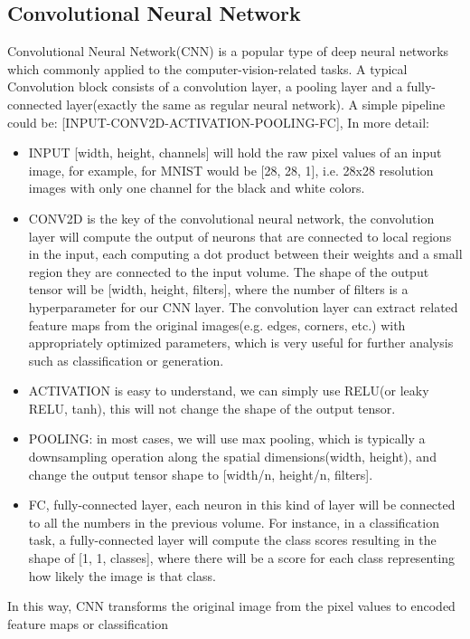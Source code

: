 \subsection{Convolutional Neural Network}
\nocite{cs231n}
Convolutional Neural Network(CNN) is a popular type of deep neural networks which commonly applied to 
the computer-vision-related tasks. 
A typical Convolution block consists of a convolution layer, a pooling layer and a 
fully-connected layer(exactly the same as regular neural network). A simple pipeline could be:
[INPUT-CONV2D-ACTIVATION-POOLING-FC], In more detail:
\begin{itemize}
    \item INPUT [width, height, channels] will hold the raw pixel values of an input image, for example, for MNIST
    would be [28, 28, 1], i.e. 28x28 resolution images with only one channel for the black and white colors.
    \item CONV2D is the key of the convolutional neural network, the convolution layer 
    will compute the output of neurons that are connected to local regions in the input, each 
    computing a dot product between their weights and a small region they are connected to the input volume.
    The shape of the output tensor will be [width, height, filters], where the number of filters is a hyperparameter for our 
    CNN layer. The convolution layer can extract related feature maps from the original images(e.g. edges, corners, etc.)
    with appropriately optimized parameters, which is very useful for further analysis 
    such as classification or generation. 
    \item ACTIVATION is easy to understand, we can simply use RELU(or leaky RELU, tanh), this will not change 
    the shape of the output tensor.
    \item POOLING: in most cases, we will use max pooling, which is typically a downsampling operation along the 
    spatial dimensions(width, height), and change the output tensor shape to [width/n, height/n, filters].
    \item FC, fully-connected layer, each neuron in this kind of layer will be connected to 
    all the numbers in the previous volume.
    For instance, in a classification task, a fully-connected layer will compute the class scores 
    resulting in the shape of [1, 1, classes], where there will be a score for each class representing 
    how likely the image is that class.
\end{itemize}
In this way, CNN transforms the original image from the pixel values to encoded feature maps or classification 
